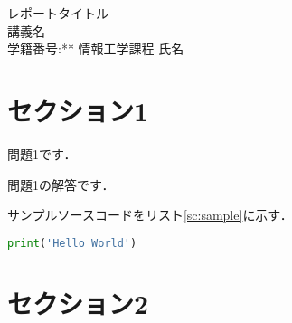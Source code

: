 \documentclass[a4paper,11pt]{jsarticle}
\begin{document}
\begin{center}
{\huge レポートタイトル}\\ %
{\Large 講義名}\\ %
{\large 学籍番号:** 情報工学課程 氏名}\\ %
\end{center}

\section{セクション1}

\begin{problem}[1]
    問題1です．
\end{problem}

\begin{answer}
    問題1の解答です．
\end{answer}

サンプルソースコードをリスト\ref{sc:sample}に示す．

\begin{lstlisting}[language=python,caption=sample.py,label=sc:sample]
    print('Hello World')
\end{lstlisting}

\section{セクション2}
\end{document}
